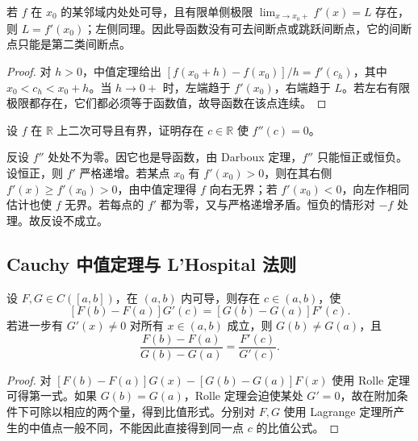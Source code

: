 \begin{proposition}
\label{prop:pei-diff-derivative-no-jump}
若 $f$ 在 $x_0$ 的某邻域内处处可导，且有限单侧极限 $\lim_{x\to x_0+}f'(x)=L$ 存在，则 $L=f'(x_0)$；左侧同理。因此导函数没有可去间断点或跳跃间断点，它的间断点只能是第二类间断点。
\end{proposition}
\begin{proof}
对 $h>0$，中值定理给出
$[f(x_0+h)-f(x_0)]/h=f'(c_h)$，其中 $x_0<c_h<x_0+h$。当 $h\to0+$ 时，左端趋于 $f'(x_0)$，右端趋于 $L$。若左右有限极限都存在，它们都必须等于函数值，故导函数在该点连续。
\end{proof}

\begin{example}
\label{ex:pei-diff-bounded-second-zero}
设 $f$ 在 $\mathbb R$ 上二次可导且有界，证明存在 $c\in\mathbb R$ 使 $f''(c)=0$。
\end{example}
\begin{solve}
反设 $f''$ 处处不为零。因它也是导函数，由 Darboux 定理，$f''$ 只能恒正或恒负。设恒正，则 $f'$ 严格递增。若某点 $x_0$ 有 $f'(x_0)>0$，则在其右侧 $f'(x)\ge f'(x_0)>0$，由中值定理得 $f$ 向右无界；若 $f'(x_0)<0$，向左作相同估计也使 $f$ 无界。若每点的 $f'$ 都为零，又与严格递增矛盾。恒负的情形对 $-f$ 处理。故反设不成立。
\end{solve}

\subsection{Cauchy 中值定理与 L'Hospital 法则}

\begin{theorem}
\label{thm:pei-diff-cauchy}
设 $F,G\in C([a,b])$，在 $(a,b)$ 内可导，则存在 $c\in(a,b)$，使
\[
 [F(b)-F(a)]G'(c)=[G(b)-G(a)]F'(c).
\]
若进一步有 $G'(x)\ne0$ 对所有 $x\in(a,b)$ 成立，则 $G(b)\ne G(a)$，且
\begin{equation}
 \frac{F(b)-F(a)}{G(b)-G(a)}=\frac{F'(c)}{G'(c)}.
 \label{eq:pei-diff-cauchy}
\end{equation}
\end{theorem}
\begin{proof}
对 $[F(b)-F(a)]G(x)-[G(b)-G(a)]F(x)$ 使用 Rolle 定理可得第一式。如果 $G(b)=G(a)$，Rolle 定理会迫使某处 $G'=0$，故在附加条件下可除以相应的两个量，得到比值形式。分别对 $F,G$ 使用 Lagrange 定理所产生的中值点一般不同，不能因此直接得到同一点 $c$ 的比值公式。
\end{proof}


